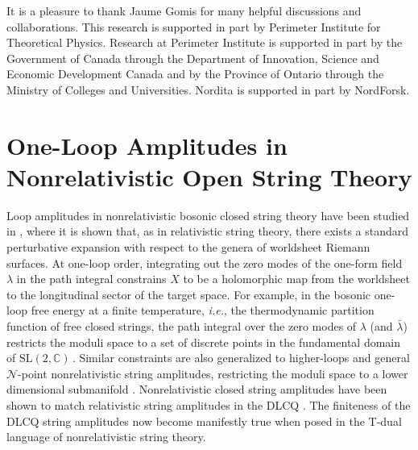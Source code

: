 \documentclass[11pt]{article}
\newcommand{\CN}{\mathcal{N}}
\begin{document}
\acknowledgments
It is a pleasure to thank Jaume Gomis for many helpful discussions and collaborations. This research is supported in part by Perimeter Institute for Theoretical Physics. Research at Perimeter Institute is supported in part by the Government of Canada through the Department of Innovation, Science and Economic Development Canada and by the Province of Ontario through the Ministry of Colleges and Universities. Nordita is supported in part by NordForsk.


\newpage

\appendix


\section{One-Loop Amplitudes in Nonrelativistic Open String Theory} \label{app:ola}

Loop amplitudes in nonrelativistic bosonic closed string theory have been studied in \cite{Gomis:2000bd}, where it is shown that, as in relativistic string theory, there exists a standard perturbative expansion with respect to the genera of worldsheet Riemann surfaces. At one-loop order, integrating out the zero modes of the one-form field $\lambda$ in the path integral constrains $X$ to be a holomorphic map from the worldsheet to the longitudinal sector of the target space. For example, in the bosonic one-loop free energy at a finite temperature, \emph{i.e.}, the thermodynamic partition function of free closed strings, the path integral over the zero modes of $\lambda$ (and $\bar{\lambda}$) restricts the moduli space to a set of discrete points in the fundamental domain of $\text{SL}(2,\mathbb{C})$\,. Similar constraints are also generalized to higher-loops and general $\CN$-point nonrelativistic string amplitudes, restricting the moduli space to a lower dimensional submanifold \cite{Gomis:2000bd}. Nonrelativistic closed string amplitudes have been shown to match relativistic string amplitudes in the DLCQ \cite{Danielsson:2000gi, Bilal:1998vq}. The finiteness of the DLCQ string amplitudes now become manifestly true when posed in the T-dual language of nonrelativistic string theory. 
\end{document}
